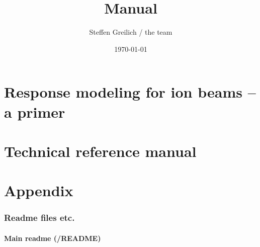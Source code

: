 \documentclass[10pt,a4paper]{book}
\title{\la{} Manual}
\author{Steffen Greilich / the \la{} team}
\date{\today}
\begin{document}
\maketitle

\tableofcontents



\part{Response modeling for ion beams -- a primer}







\part{Technical reference manual}









\part{Appendix}
\section{Readme files etc.}
\subsection{Main readme (/README)}




\end{document}
